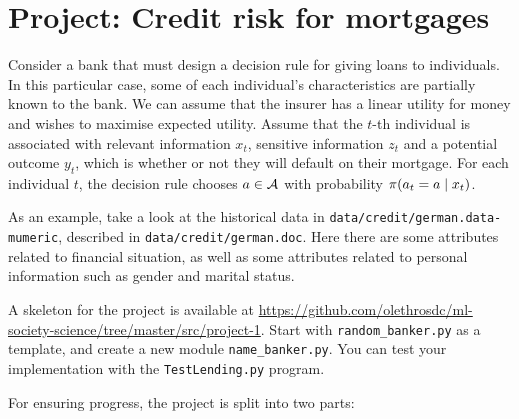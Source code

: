 \section{Project: Credit risk for mortgages}

Consider a bank that must design a decision rule for giving loans to individuals. In this particular case, some of each individual's characteristics are partially known to the bank.  We can assume that the insurer has a linear utility for money and wishes to maximise expected utility. Assume that the $t$-th individual is associated with relevant information $x_t$, sensitive information $z_t$ and a potential outcome $y_t$, which is whether or not they will default on their mortgage. For each individual $t$, the decision rule chooses $a \in {\mathcal{A}}$ with probability $\pi(a_t = a \mid x_t)$.

As an example, take a look at the historical data in \texttt{data/credit/german.data-mumeric}, described in \texttt{data/credit/german.doc}. Here there are some attributes related to financial situation, as well as some attributes related to personal information such as gender and marital status. 

A skeleton for the project is available at \url{https://github.com/olethrosdc/ml-society-science/tree/master/src/project-1}. Start with \verb|random_banker.py| as a template, and create a new module \verb|name_banker.py|. You can test your implementation with the \verb|TestLending.py| program. 

For ensuring progress, the project is split into two parts:
